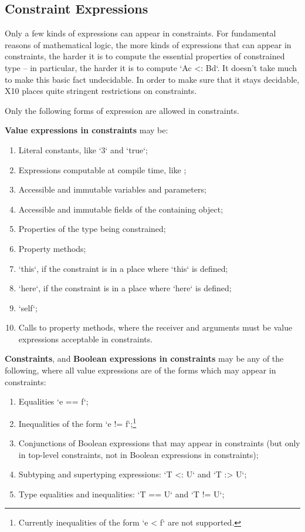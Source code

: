 \subsection{Constraint Expressions}




Only a few kinds of expressions can appear in constraints.  For fundamental
reasons of mathematical logic, the more kinds of expressions that can appear
in constraints, the harder it is to compute the essential properties of
constrained type -- in particular, the harder it is to compute 
\xcd`A{c} <: B{d}`.  It doesn't take much to make this basic fact undecidable.
In order to
make sure that it stays decidable, X10 places quite stringent restrictions on
constraints.  

Only the following forms of expression are allowed in constraints.  

{\bf Value expressions in constraints} may be: 
\begin{enumerate}
\item Literal constants, like \xcd`3` and \xcd`true`;
\item Expressions computable at compile time, like ;
\item Accessible and immutable variables and parameters;
\item Accessible and immutable fields of the containing object;
\item Properties of the type being constrained;
\item Property methods;
\item \xcd`this`, if the constraint is in a place where \xcd`this` is defined;
\item \xcd`here`, if the constraint is in a place where \xcd`here` is defined;
\item \xcd`self`;
\item Calls to property methods, where the receiver and arguments must be
      value expressions acceptable in constraints.
\end{enumerate}


{\bf Constraints}, and {\bf Boolean expressions in constraints}  may be any of
the following, where 
all value expressions are of the forms which may appear in constraints: 
\begin{enumerate}
\item Equalities \xcd`e == f`;
\item Inequalities of the form \xcd`e != f`;\footnote{Currently inequalities
      of the form \xcd`e < f` are not supported.}
\item Conjunctions of Boolean expressions that may appear in constraints (but
      only in top-level constraints, not in Boolean expressions in constraints);
\item Subtyping and supertyping expressions: \xcd`T <: U` and \xcd`T :> U`; 
\item Type equalities and inequalities: \xcd`T == U` and \xcd`T != U`; 
\end{enumerate}

